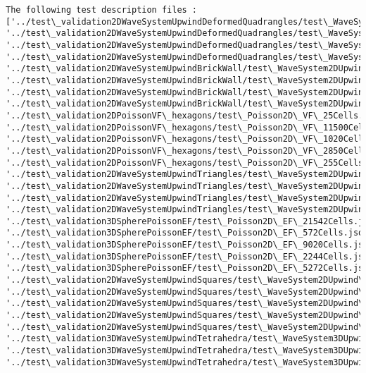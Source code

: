 \documentclass[11pt]{article}
\begin{document}
    \begin{Verbatim}[commandchars=\\\{\}]
The following test description files : 
['../test\_validation2DWaveSystemUpwindDeformedQuadrangles/test\_WaveSystem2DUpwind\_SquareWithDeformedQuadrangles16Cells.json', '../test\_validation2DWaveSystemUpwindDeformedQuadrangles/test\_WaveSystem2DUpwind\_SquareWithDeformedQuadrangles256Cells.json', '../test\_validation2DWaveSystemUpwindDeformedQuadrangles/test\_WaveSystem2DUpwind\_SquareWithDeformedQuadrangles64Cells.json', '../test\_validation2DWaveSystemUpwindDeformedQuadrangles/test\_WaveSystem2DUpwind\_SquareWithDeformedQuadrangles1024Cells.json', '../test\_validation2DWaveSystemUpwindBrickWall/test\_WaveSystem2DUpwind\_squareWithBrickWall2500Cells.json', '../test\_validation2DWaveSystemUpwindBrickWall/test\_WaveSystem2DUpwind\_squareWithBrickWall900Cells.json', '../test\_validation2DWaveSystemUpwindBrickWall/test\_WaveSystem2DUpwind\_squareWithBrickWall225Cells.json', '../test\_validation2DWaveSystemUpwindBrickWall/test\_WaveSystem2DUpwind\_squareWithBrickWall25Cells.json', '../test\_validation2DPoissonVF\_hexagons/test\_Poisson2D\_VF\_25Cells.json', '../test\_validation2DPoissonVF\_hexagons/test\_Poisson2D\_VF\_11500Cells.json', '../test\_validation2DPoissonVF\_hexagons/test\_Poisson2D\_VF\_1020Cells.json', '../test\_validation2DPoissonVF\_hexagons/test\_Poisson2D\_VF\_2850Cells.json', '../test\_validation2DPoissonVF\_hexagons/test\_Poisson2D\_VF\_255Cells.json', '../test\_validation2DWaveSystemUpwindTriangles/test\_WaveSystem2DUpwind\_squareWithTriangles6422Cells.json', '../test\_validation2DWaveSystemUpwindTriangles/test\_WaveSystem2DUpwind\_squareWithTriangles934Cells.json', '../test\_validation2DWaveSystemUpwindTriangles/test\_WaveSystem2DUpwind\_squareWithTriangles40Cells.json', '../test\_validation2DWaveSystemUpwindTriangles/test\_WaveSystem2DUpwind\_squareWithTriangles224Cells.json', '../test\_validation3DSpherePoissonEF/test\_Poisson2D\_EF\_21542Cells.json', '../test\_validation3DSpherePoissonEF/test\_Poisson2D\_EF\_572Cells.json', '../test\_validation3DSpherePoissonEF/test\_Poisson2D\_EF\_9020Cells.json', '../test\_validation3DSpherePoissonEF/test\_Poisson2D\_EF\_2244Cells.json', '../test\_validation3DSpherePoissonEF/test\_Poisson2D\_EF\_5272Cells.json', '../test\_validation2DWaveSystemUpwindSquares/test\_WaveSystem2DUpwind\_meshSquareWithSquares16Cells.json', '../test\_validation2DWaveSystemUpwindSquares/test\_WaveSystem2DUpwind\_meshSquareWithSquares4096Cells.json', '../test\_validation2DWaveSystemUpwindSquares/test\_WaveSystem2DUpwind\_meshSquareWithSquares64Cells.json', '../test\_validation2DWaveSystemUpwindSquares/test\_WaveSystem2DUpwind\_meshSquareWithSquares1024Cells.json', '../test\_validation2DWaveSystemUpwindSquares/test\_WaveSystem2DUpwind\_meshSquareWithSquares256Cells.json', '../test\_validation3DWaveSystemUpwindTetrahedra/test\_WaveSystem3DUpwind\_CubeWithTetrahedra55566Cells.json', '../test\_validation3DWaveSystemUpwindTetrahedra/test\_WaveSystem3DUpwind\_CubeWithTetrahedra7986Cells.json', '../test\_validation3DWaveSystemUpwindTetrahedra/test\_WaveSystem3DUpwind\_CubeWithTetrahedra750Cells.json', 
\end{Verbatim}
\end{document}
